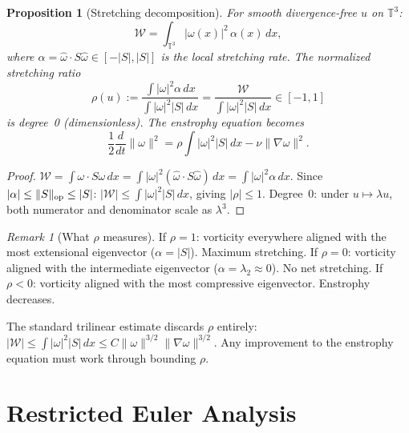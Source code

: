 \documentclass[11pt,a4paper]{article}
\theoremstyle{plain}
\newtheorem{proposition}[theorem]{Proposition}
\theoremstyle{definition}
\theoremstyle{remark}
\newtheorem{remark}[theorem]{Remark}
\newcommand{\T}{\mathbb{T}}
\begin{document}
\begin{proposition}[Stretching decomposition]
\label{prop:stretching-decomp}
For smooth divergence-free $u$ on $\T^3$:
\begin{equation}\label{eq:W-alpha}
\mathcal{W} = \int_{\T^3}|\omega(x)|^2\,
\alpha(x)\,dx,
\end{equation}
where $\alpha = \hat\omega\cdot S\hat\omega
\in[-|S|,|S|]$ is the local stretching rate.
The normalized stretching ratio
\begin{equation}\label{eq:rho-def}
\rho(u) := \frac{\int|\omega|^2\alpha\,dx}
{\int|\omega|^2|S|\,dx}
= \frac{\mathcal{W}}{\int|\omega|^2|S|\,dx}
\in [-1,1]
\end{equation}
is degree~0 (dimensionless).  The enstrophy equation
becomes
\begin{equation}\label{eq:enst-rho}
\frac{1}{2}\frac{d}{dt}\|\omega\|^2
= \rho\int|\omega|^2|S|\,dx
- \nu\|\nabla\omega\|^2.
\end{equation}
\end{proposition}

\begin{proof}
$\mathcal{W} = \int\omega\cdot S\omega\,dx
= \int|\omega|^2(\hat\omega\cdot S\hat\omega)\,dx
= \int|\omega|^2\alpha\,dx$.
Since $|\alpha|\leq\|S\|_{\rm op}\leq|S|$:
$|\mathcal{W}|\leq\int|\omega|^2|S|\,dx$,
giving $|\rho|\leq 1$.  Degree~0: under
$u\mapsto\lambda u$, both numerator and denominator
scale as $\lambda^3$.
\end{proof}

\begin{remark}[What $\rho$ measures]
\label{rem:rho-meaning}
If $\rho=1$: vorticity everywhere aligned with the
most extensional eigenvector ($\alpha=|S|$).
Maximum stretching.
If $\rho=0$: vorticity aligned with the intermediate
eigenvector ($\alpha=\lambda_2\approx 0$).
No net stretching.
If $\rho<0$: vorticity aligned with the most
compressive eigenvector.  Enstrophy decreases.

The standard trilinear estimate discards $\rho$
entirely:
$|\mathcal{W}|\leq\int|\omega|^2|S|\,dx
\leq C\|\omega\|^{3/2}\|\nabla\omega\|^{3/2}$.
Any improvement to the enstrophy equation must work
through bounding $\rho$.
\end{remark}


\section{Restricted Euler Analysis}\label{sec:RE}
\end{document}
